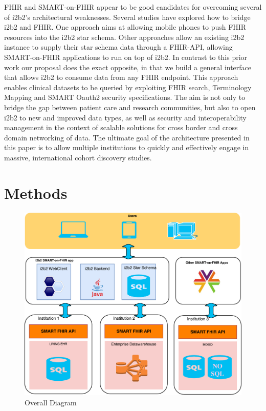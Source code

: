 \documentclass{amia}
\newcommand{\remXavier}[1]{\todo[color=yellow]{[XT]{\scriptsize #1\par}}}
\newcommand{\remNico}[1]{\todo[color=orange]{[NP]{\scriptsize #1\par}}}
\begin{document}
FHIR and SMART-on-FHIR appear to be good candidates for overcoming several of i2b2's architectural weaknesses. Several studies have explored how to bridge i2b2 and FHIR. One approach\cite{Pfiffner__2016} aims at allowing mobile phones to push FHIR resources into the i2b2 star schema. Other approaches \cite{Wagholikar_2016,Boussadi_Zapletal_2017} allow an existing i2b2 instance to supply their star schema data through a FHIR-API, allowing SMART-on-FHIR applications to run on top of i2b2. In contrast to this prior work our proposal does the exact opposite, in that we build a general interface that allows i2b2 to consume data from any FHIR endpoint. This approach enables clinical datasets to be queried by exploiting FHIR search, Terminology Mapping\cite{FHIR} and SMART Oauth2 security\cite{SMARTFHIR} specifications. The aim is not only to bridge the gap between patient care and research communities, but also to open i2b2 to new and improved data types, as well as security and interoperability management in the context of scalable solutions for cross border and cross domain networking of data. The ultimate goal of the architecture presented in this paper is to allow multiple institutions to quickly and effectively engage in massive, international cohort discovery studies.

\section*{Methods}
\begin{figure}[h]
\centering
\includegraphics[width=.8\linewidth]{overall.pdf}
	\caption{Overall Diagram}
\label{overall}
\end{figure}
\end{document}
